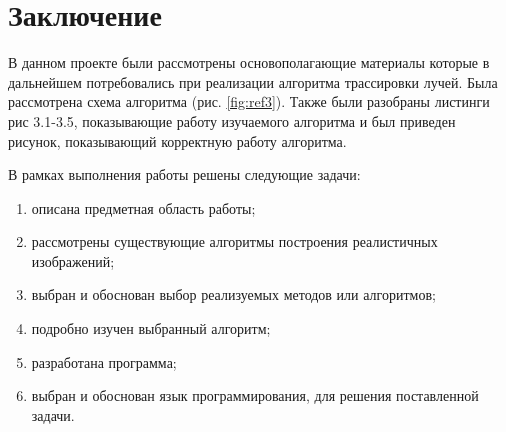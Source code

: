 \chapter*{Заключение}

В данном проекте были рассмотрены
основополагающие материалы которые в дальнейшем потребовались
при реализации алгоритма трассировки лучей.
Была рассмотрена схема алгоритма (рис. \ref{fig:ref3}).
Также были разобраны листинги рис 3.1-3.5,
показывающие работу изучаемого алгоритма
и был приведен рисунок,
показывающий корректную работу алгоритма.

В рамках выполнения работы решены следующие задачи:

\begin{enumerate}
	\item описана предметная область работы;
	\item рассмотрены существующие алгоритмы построения реалистичных изображений;
	\item выбран и обоснован выбор реализуемых методов или алгоритмов;
	\item подробно изучен выбранный алгоритм;
	\item разработана программа;
	\item выбран и обоснован язык программирования, для решения поставленной задачи.
\end{enumerate}

